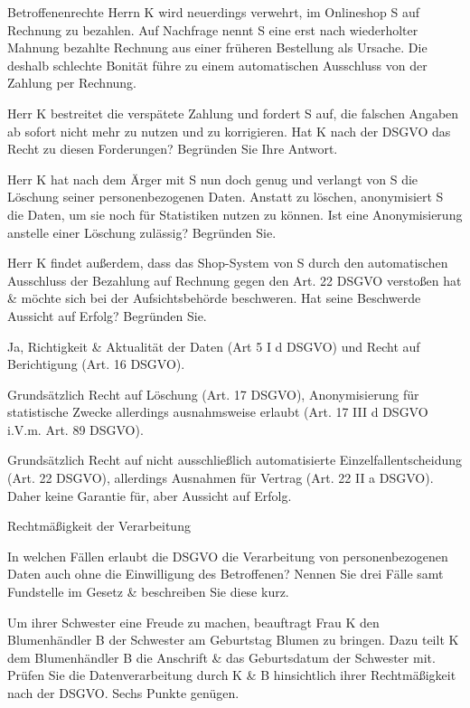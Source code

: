 \documentclass{article}
\begin{document}
\begin{eexercises}{Betroffenenrechte}{
    Herrn K wird neuerdings verwehrt, im Onlineshop S auf Rechnung zu bezahlen. Auf Nachfrage nennt S eine erst nach wiederholter Mahnung bezahlte Rechnung aus einer früheren Bestellung als Ursache. Die deshalb schlechte Bonität führe zu einem automatischen Ausschluss von der Zahlung per Rechnung.
  }
  \item Herr K bestreitet die verspätete Zahlung und fordert S auf, die falschen Angaben ab sofort nicht mehr zu nutzen und zu korrigieren. Hat K nach der DSGVO das Recht zu diesen Forderungen? Begründen Sie Ihre Antwort.
  \item Herr K hat nach dem Ärger mit S nun doch genug und verlangt von S die Löschung seiner personenbezogenen Daten. Anstatt zu löschen, anonymisiert S die Daten, um sie noch für Statistiken nutzen zu können. Ist eine Anonymisierung anstelle einer Löschung zulässig? Begründen Sie.
  \item Herr K findet außerdem, dass das Shop-System von S durch den automatischen Ausschluss der Bezahlung auf Rechnung gegen den Art. 22 DSGVO verstoßen hat \& möchte sich bei der Aufsichtsbehörde beschweren. Hat seine Beschwerde Aussicht auf Erfolg? Begründen Sie.
\end{eexercises}

\begin{solutions}
  \item Ja, Richtigkeit \& Aktualität der Daten (Art 5 I d DSGVO) und Recht auf Berichtigung (Art. 16 DSGVO).
  \item Grundsätzlich Recht auf Löschung (Art. 17 DSGVO), Anonymisierung für statistische Zwecke allerdings ausnahmsweise erlaubt (Art. 17 III d DSGVO i.V.m. Art. 89 DSGVO).
  \item Grundsätzlich Recht auf nicht ausschließlich automatisierte Einzelfallentscheidung (Art. 22 DSGVO), allerdings Ausnahmen für Vertrag (Art. 22 II a DSGVO). Daher keine Garantie für, aber Aussicht auf Erfolg.
\end{solutions}

\begin{exercises}{Rechtmäßigkeit der Verarbeitung}
\item In welchen Fällen erlaubt die DSGVO die Verarbeitung von personenbezogenen Daten auch ohne die Einwilligung des Betroffenen? Nennen Sie drei Fälle samt Fundstelle im Gesetz \& beschreiben Sie diese kurz.
\item Um ihrer Schwester eine Freude zu machen, beauftragt Frau K den Blumenhändler B der Schwester am Geburtstag Blumen zu bringen. Dazu teilt K dem Blumenhändler B die Anschrift \& das Geburtsdatum der Schwester mit. Prüfen Sie die Datenverarbeitung durch K \& B hinsichtlich ihrer Rechtmäßigkeit nach der DSGVO. Sechs Punkte genügen.
\end{exercises}
\end{document}
